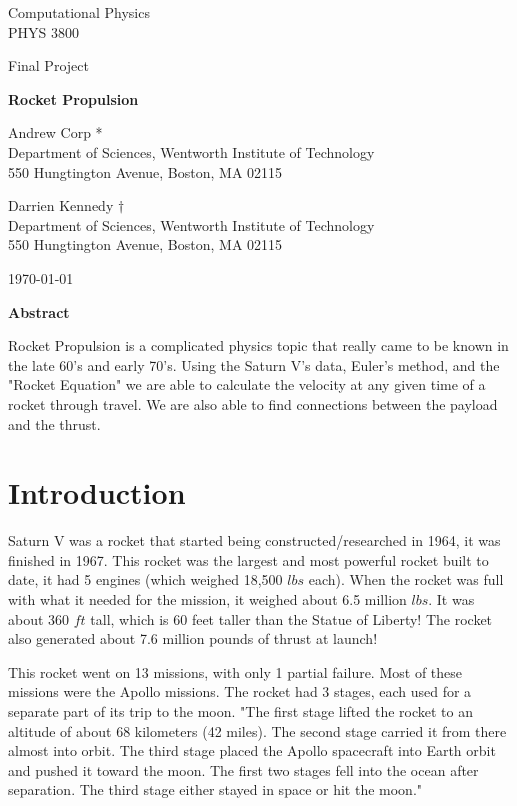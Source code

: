\documentclass[11pt]{article}
\begin{document}
\begin{titlepage}

	\centering
	{\Large Computational Physics \\ PHYS 3800 \par}
	\vspace{0.25cm}
	{\Large Final Project\par}
	\vspace{2cm}
	
	{\huge \textbf{ Rocket Propulsion} \par}
	\vspace{1cm}
	
	{\large Andrew Corp * \\ Department of Sciences, Wentworth Institute of Technology \\ 550 Hungtington Avenue, Boston, MA 02115}
	
		{\large Darrien Kennedy $\dagger$ \\ Department of Sciences, Wentworth Institute of Technology \\ 550 Hungtington Avenue, Boston, MA 02115}

	{\large \today \par}
\end{titlepage}
\newpage

{\centering \textbf{Abstract} \par}

Rocket Propulsion is a complicated physics topic that really came to be known in the late 60's and early 70's. Using the Saturn V's data, Euler's method, and the "Rocket Equation" we are able to calculate the velocity at any given time of a rocket through travel. We are also able to find connections between the payload and the thrust. 

\section{Introduction}
\par Saturn V was a rocket that started being constructed/researched in 1964, it was finished in 1967. This rocket was the largest and most powerful rocket built to date, it had 5 engines (which weighed 18,500 $lbs$ each). When the rocket was full with what it needed for the mission, it weighed about 6.5 million $lbs$. It was about 360 $ft$ tall, which is 60 feet taller than the Statue of Liberty! The rocket also generated about 7.6 million pounds of thrust at launch! 

\vspace{.25cm}
This rocket went on 13 missions, with only 1 partial failure. Most of these missions were the Apollo missions. The rocket had 3 stages, each used for a separate part of its trip to the moon. "The first stage lifted the rocket to an altitude of about 68 kilometers (42 miles). The second stage carried it from there almost into orbit. The third stage placed the Apollo spacecraft into Earth orbit and pushed it toward the moon. The first two stages fell into the ocean after separation. The third stage either stayed in space or hit the moon." \cite{saturnv}
\end{document}

